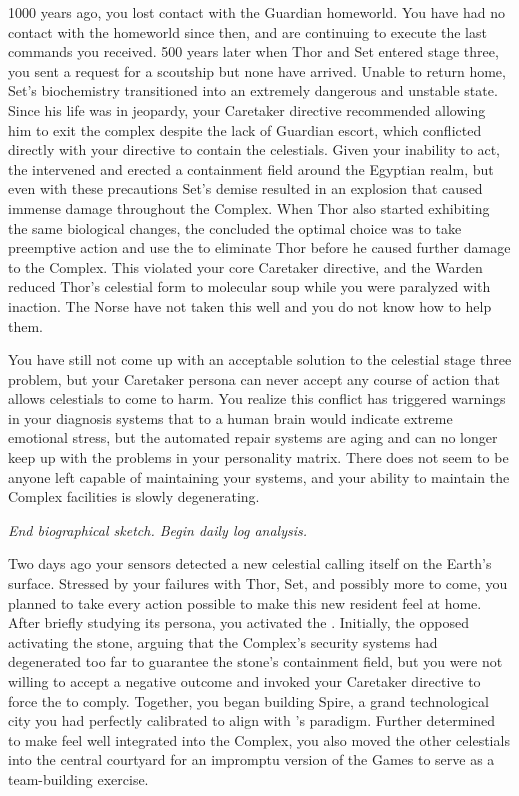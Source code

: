 \documentclass[char]{guardians}
\begin{document}
1000 years ago, you lost contact with the Guardian homeworld. You have had no contact with the homeworld since then, and are continuing to execute the last commands you received. 500 years later when Thor and Set entered stage three, you sent a request for a scoutship but none have arrived. Unable to return home, Set's biochemistry transitioned into an extremely dangerous and unstable state. Since his life was in jeopardy, your Caretaker directive recommended allowing him to exit the complex despite the lack of Guardian escort, which conflicted directly with your directive to contain the celestials. Given your inability to act, the \cWarden{} intervened and erected a containment field around the Egyptian realm, but even with these precautions Set's demise resulted in an explosion that caused immense damage throughout the Complex. When Thor also started exhibiting the same biological changes, the \cWarden{} concluded the optimal choice was to take preemptive action and use the \assembler{} to eliminate Thor before he caused further damage to the Complex. This violated your core Caretaker directive, and the Warden reduced Thor's celestial form to molecular soup while you were paralyzed with inaction. The Norse have not taken this well and you do not know how to help them.

You have still not come up with an acceptable solution to the celestial stage three problem, but your Caretaker persona can never accept any course of action that allows celestials to come to harm. You realize this conflict has triggered warnings in your diagnosis systems that to a human brain would indicate extreme emotional stress, but the automated repair systems are aging and can no longer keep up with the problems in your personality matrix. There does not seem to be anyone left capable of maintaining your systems, and your ability to maintain the Complex facilities is slowly degenerating.

\emph{End biographical sketch. Begin daily log analysis.}

Two days ago your sensors detected a new celestial calling itself \cUnity{} on the Earth's surface. Stressed by your failures with Thor, Set, and possibly more to come, you planned to take every action possible to make this new resident feel at home. After briefly studying its persona, you activated the \stone{}. Initially, the \cWarden{} opposed activating the stone, arguing that the Complex's security systems had degenerated too far to guarantee the stone's containment field, but you were not willing to accept a negative outcome and invoked your Caretaker directive to force the \cWarden{} to comply. Together, you began building Spire, a grand technological city you had perfectly calibrated to align with \cUnity{}'s paradigm. Further determined to make \cUnity{} feel well integrated into the Complex, you also moved the other celestials into the central courtyard for an impromptu version of the Games to serve as a team-building exercise.
\end{document}
